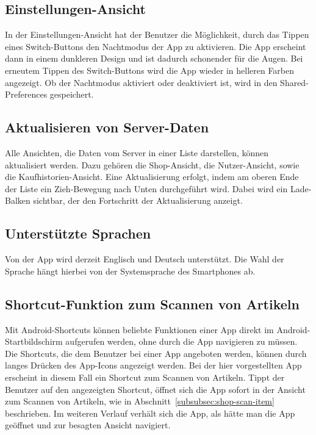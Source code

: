 
\subsection{Einstellungen-Ansicht} \label{subsec:settings-screen}

In der Einstellungen-Ansicht hat der Benutzer die Möglichkeit, durch das Tippen eines Switch-Buttons den Nachtmodus der App zu aktivieren.
Die App erscheint dann in einem dunkleren Design und ist dadurch schonender für die Augen.
Bei erneutem Tippen des Switch-Buttons wird die App wieder in helleren Farben angezeigt.
Ob der Nachtmodus aktiviert oder deaktiviert ist, wird in den Shared-Preferences gespeichert.

\subsection{Aktualisieren von Server-Daten}\label{subsec:aktualisieren-von-server-daten}

Alle Ansichten, die Daten vom Server in einer Liste darstellen, können aktualisiert werden.
Dazu gehören die Shop-Ansicht, die Nutzer-Ansicht, sowie die Kaufhistorien-Ansicht.
Eine Aktualisierung erfolgt, indem am oberen Ende der Liste ein Zieh-Bewegung nach Unten durchgeführt wird.
Dabei wird ein Lade-Balken sichtbar, der den Fortschritt der Aktualisierung anzeigt.

\subsection{Unterstützte Sprachen} \label{subsec:languages}

Von der App wird derzeit Englisch und Deutsch unterstützt.
Die Wahl der Sprache hängt hierbei von der Systemsprache des Smartphones ab.

\subsection{Shortcut-Funktion zum Scannen von Artikeln} \label{subsec:scan-item-shortcut}

Mit Android-Shortcuts können beliebte Funktionen einer App direkt im Android-Startbildschirm aufgerufen werden, ohne durch die App navigieren zu müssen.
Die Shortcuts, die dem Benutzer bei einer App angeboten werden, können durch langes Drücken des App-Icons angezeigt werden.
Bei der hier vorgestellten App erscheint in diesem Fall ein Shortcut zum Scannen von Artikeln.
Tippt der Benutzer auf den angezeigten Shortcut, öffnet sich die App sofort in der Ansicht zum Scannen von Artikeln, wie in Abschnitt~\ref{subsubsec:shop-scan-item} beschrieben.
Im weiteren Verlauf verhält sich die App, als hätte man die App geöffnet und zur besagten Ansicht navigiert.
